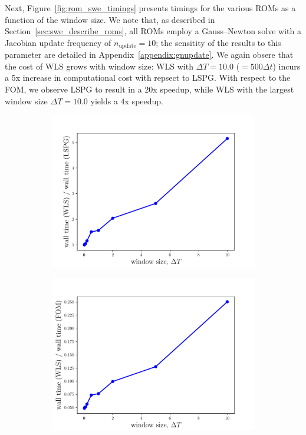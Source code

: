 Next, Figure~\ref{fig:rom_swe_timings} presents timings for the various ROMs as a function of the window size. We note that, as described in Section~\ref{sec:swe_describe_roms}, all ROMs employ a Gauss--Newton solve with a Jacobian update frequency of $n_{\text{update}} = 10$; the sensitity of the results to this parameter are detailed in Appendix~\ref{appendix:gnupdate}. We again obsere that the cost of WLS grows with window size: WLS with $\Delta T = 10.0$ ($=500\Delta t$) incurs a 5x increase in computational cost with repsect to LSPG. With respect to the FOM, we observe LSPG to result in a $20$x speedup, while WLS with the largest window size $\Delta T = 10.0$ yields a $4$x speedup.  
\begin{figure}
\begin{center}
\begin{subfigure}[t]{0.49\textwidth}
\includegraphics[trim={0cm 0cm 0cm 0cm},clip,width=1.0\linewidth]{figs/swe/swe_windowSize_vs_walltimeLspg_updateFreq_K83.pdf}
\end{subfigure}
\begin{subfigure}[t]{0.49\textwidth}
\includegraphics[trim={0cm 0cm 0cm 0cm},clip,width=1.0\linewidth]{figs/swe/swe_windowSize_vs_walltimeFom_updateFreq_K83.pdf}

\end{subfigure}
\end{center}
\end{figure}
